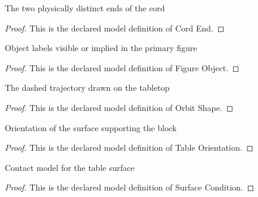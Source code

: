 \begin{definition}
  \label{def:physics:phyx-mini-0243:phyxminiproblems-problemphyxmini0243-cordend}
  The two physically distinct ends of the cord
\end{definition}
\begin{proof}
  This is the declared model definition of Cord End.
\end{proof}
\begin{definition}
  \label{def:physics:phyx-mini-0243:phyxminiproblems-problemphyxmini0243-figureobject}
  Object labels visible or implied in the primary figure
\end{definition}
\begin{proof}
  This is the declared model definition of Figure Object.
\end{proof}
\begin{definition}
  \label{def:physics:phyx-mini-0243:phyxminiproblems-problemphyxmini0243-orbitshape}
  The dashed trajectory drawn on the tabletop
\end{definition}
\begin{proof}
  This is the declared model definition of Orbit Shape.
\end{proof}
\begin{definition}
  \label{def:physics:phyx-mini-0243:phyxminiproblems-problemphyxmini0243-tableorientation}
  Orientation of the surface supporting the block
\end{definition}
\begin{proof}
  This is the declared model definition of Table Orientation.
\end{proof}
\begin{definition}
  \label{def:physics:phyx-mini-0243:phyxminiproblems-problemphyxmini0243-surfacecondition}
  Contact model for the table surface
\end{definition}
\begin{proof}
  This is the declared model definition of Surface Condition.
\end{proof}
